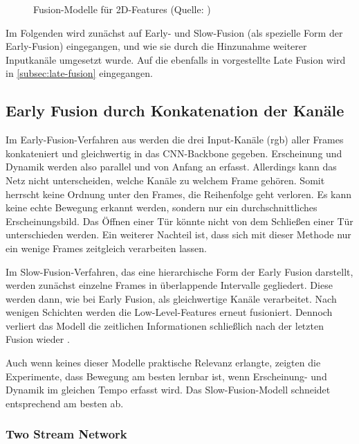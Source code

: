 \begin{figure}[h!]
    \centering
    \caption{Fusion-Modelle für 2D-Features (Quelle: \cite{Karpathy14})}
    \label{fig:fusion-types}
\end{figure}

Im Folgenden wird zunächst auf Early- und Slow-Fusion (als spezielle Form der Early-Fusion) eingegangen, und wie sie durch die Hinzunahme weiterer Inputkanäle umgesetzt wurde.
Auf die ebenfalls in \cite{Karpathy14} vorgestellte Late Fusion wird in \autoref{subsec:late-fusion} eingegangen.

\subsection{Early Fusion durch Konkatenation der Kanäle}
\label{sec:early-fusion}

Im Early-Fusion-Verfahren aus \cite{Karpathy14} werden die drei Input-Kanäle (\gls{rgb}) aller Frames konkateniert und gleichwertig in das CNN-Backbone gegeben.
Erscheinung und Dynamik werden also parallel und von Anfang an erfasst.
Allerdings kann das Netz nicht unterscheiden, welche Kanäle zu welchem Frame gehören.
Somit herrscht keine Ordnung unter den Frames, \dh die Reihenfolge geht verloren.
Es kann keine echte Bewegung erkannt werden, sondern nur ein durchschnittliches Erscheinungsbild.
Das Öffnen einer Tür könnte \zB nicht von dem Schließen einer Tür unterschieden werden.
Ein weiterer Nachteil ist, dass sich mit dieser Methode nur ein wenige Frames zeitgleich verarbeiten lassen.

Im Slow-Fusion-Verfahren, das eine hierarchische Form der Early Fusion darstellt, werden zunächst einzelne Frames in überlappende Intervalle gegliedert.
Diese werden dann, wie bei Early Fusion, als gleichwertige Kanäle verarbeitet.
Nach wenigen Schichten werden die Low-Level-Features erneut fusioniert.
Dennoch verliert das Modell die zeitlichen Informationen schließlich nach der letzten Fusion wieder \cite{Tran15}.

Auch wenn keines dieser Modelle praktische Relevanz erlangte, zeigten die Experimente, dass Bewegung am besten lernbar ist, wenn Erscheinung- und Dynamik im gleichen Tempo erfasst wird.
Das Slow-Fusion-Modell schneidet entsprechend am besten ab.

\subsubsection{Two Stream Network}

